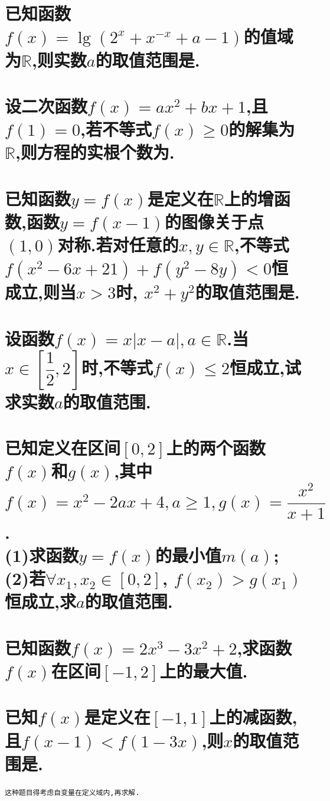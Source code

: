 \documentclass[oneside]{book}
\newcommand{\1}{\underline{\makebox[1cm]{}}}
\newcommand{\2}{\underline{\makebox[2cm]{}}}
\newcommand{\3}{\underline{\makebox[3cm]{}}}
\newcommand{\4}{\underline{\makebox[4cm]{}}}
\newcommand{\blkx}{\vspace*{4\baselineskip} }
\newcommand{\blkc}{\vspace*{6\baselineskip} }
\newcommand{\lge}{\large \texttt}
\newlength{\la}
\begin{document}
        \section{已知函数$f(x)=\lg(2^x+x^{-x}+a-1)$的值域为$\mathbb{R}$,则实数$a$的取值范围是\3.}
        \blkx
        
        \section{设二次函数$f(x)=ax^2+bx+1$,且$f(1)=0$,若不等式$f(x) \geq 0$的解集为$\mathbb{R}$,则方程的实根个数为\2.}
        \blkx
        
        \section{已知函数$y=f(x)$是定义在$\mathbb{R}$上的增函数,函数$y=f(x-1)$的图像关于点$(1,0)$对称.若对任意的$x,y\in \mathbb{R}$,不等式$f(x^2-6x+21)+f(y^2-8y)<0$恒成立,则当$x>3$时, $x^2+y^2$的取值范围是\3.}
        \blkc
        
        \section{设函数$f(x)=x|x-a|, a\in \mathbb{R}$.当$x\in [\dfrac{1}{2},2]$时,不等式$f(x)\leq 2$恒成立,试求实数$a$的取值范围.}
        \newpage
        
        \section{已知定义在区间$[0,2]$上的两个函数$f(x)$和$g(x)$,其中$f(x)=x^2-2ax+4, a\geq 1, g(x)=\dfrac{x^2}{x+1}$.\\(1)求函数$y=f(x)$的最小值$m(a)$;\\(2)若$\forall x_1, x_2\in [0,2]$, $f(x_2)>g(x_1)$恒成立,求$a$的取值范围.}
        \blkc

        \section{已知函数$f(x)=2x^3-3x^2+2$,求函数$f(x)$在区间$[-1, 2]$上的最大值.}

        \section{已知$f(x)$是定义在$[-1,1]$上的减函数,且$f(x-1)<f(1-3x)$,则$x$的取值范围是\2.}
        \lge{这种题目得考虑自变量在定义域内,再求解.}
        
\end{document}
